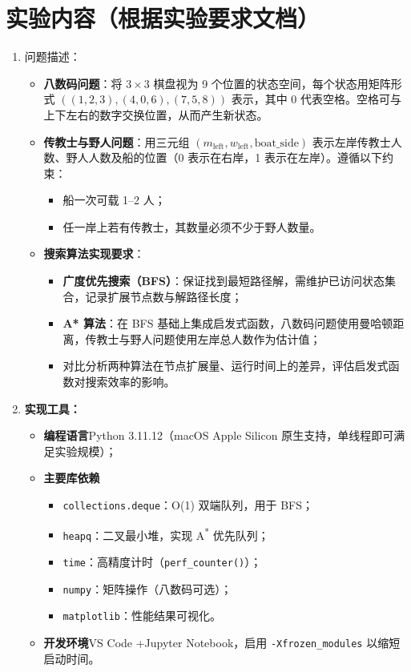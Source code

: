\documentclass[UTF8]{ctexart}
\begin{document}
\section*{实验内容（根据实验要求文档）}
\begin{enumerate}
  \item 问题描述：
  \begin{itemize}
    \item \textbf{八数码问题}：将 $3\times3$ 棋盘视为 9 个位置的状态空间，每个状态用矩阵形式 $((1,2,3),(4,0,6),(7,5,8))$ 表示，其中 0 代表空格。空格可与上下左右的数字交换位置，从而产生新状态。
    \item \textbf{传教士与野人问题}：用三元组 $(m_{\text{left}},w_{\text{left}},\text{boat\_side})$ 表示左岸传教士人数、野人人数及船的位置（0 表示在右岸，1 表示在左岸）。遵循以下约束：
      \begin{itemize}
        \item 船一次可载 1–2 人；
        \item 任一岸上若有传教士，其数量必须不少于野人数量。
      \end{itemize}
    \item \textbf{搜索算法实现要求}：
      \begin{itemize}
        \item \textbf{广度优先搜索（BFS）}：保证找到最短路径解，需维护已访问状态集合，记录扩展节点数与解路径长度；
        \item \textbf{A* 算法}：在 BFS 基础上集成启发式函数，八数码问题使用曼哈顿距离，传教士与野人问题使用左岸总人数作为估计值；
        \item 对比分析两种算法在节点扩展量、运行时间上的差异，评估启发式函数对搜索效率的影响。
      \end{itemize}
  \end{itemize}

  \item \textbf{实现工具：}
  \begin{itemize}
    \item \textbf{编程语言}\quad Python 3.11.12（macOS Apple Silicon 原生支持，单线程即可满足实验规模）；
    \item \textbf{主要库依赖}
      \begin{itemize}
        \item \texttt{collections.deque}：O(1) 双端队列，用于 BFS；
        \item \texttt{heapq}：二叉最小堆，实现 A\textsuperscript{*} 优先队列；
        \item \texttt{time}：高精度计时（\texttt{perf\_counter()}）；
        \item \texttt{numpy}：矩阵操作（八数码可选）；
        \item \texttt{matplotlib}：性能结果可视化。
      \end{itemize}
    \item \textbf{开发环境}\quad VS Code +\;Jupyter Notebook，启用 \texttt{-Xfrozen\_modules} 以缩短启动时间。
  \end{itemize}


\end{enumerate}
\end{document}
